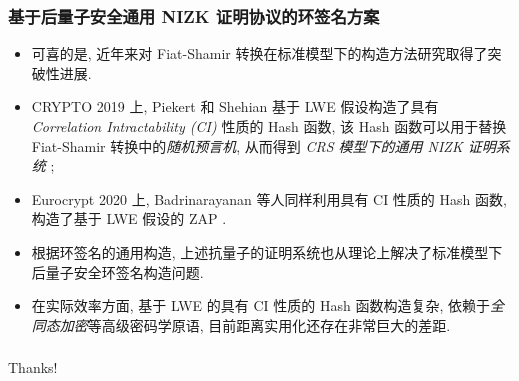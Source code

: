 \documentclass{beamer}
\begin{document}
\begin{frame}
    \frametitle{基于后量子安全通用 NIZK 证明协议的环签名方案}
    \begin{itemize}
        \item 可喜的是, 近年来对 Fiat-Shamir 转换在标准模型下的构造方法研究取得了突破性进展. 
        \item CRYPTO 2019 上, Piekert 和 Shehian 基于 LWE 假设构造了具有 \emph{Correlation Intractability (CI)} 性质的 Hash 函数, 该 Hash 函数可以用于替换 Fiat-Shamir 转换中的\emph{随机预言机}, 从而得到 \emph{CRS 模型下的通用 NIZK 证明系统} ; 
        \item Eurocrypt 2020 上, Badrinarayanan 等人同样利用具有 CI 性质的 Hash 函数, 构造了基于 LWE 假设的 ZAP . 
        \item 根据环签名的通用构造, 上述抗量子的证明系统也从理论上解决了标准模型下后量子安全环签名构造问题. 
        \item 在实际效率方面, 基于 LWE 的具有 CI 性质的 Hash 函数构造复杂, 依赖于\emph{全同态加密}等高级密码学原语, 目前距离实用化还存在非常巨大的差距.
    \end{itemize}

    

\end{frame}

\begin{frame}
    \frametitle{}

    \centerline{Thanks!}

\end{frame}
\end{document}
